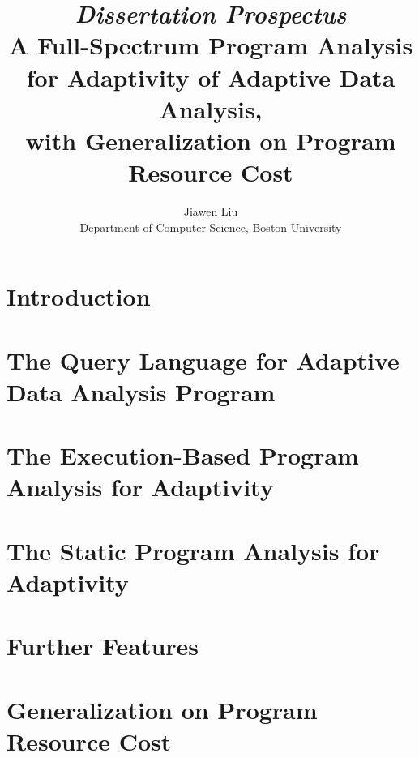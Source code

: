\documentclass[a4paper,11pt]{article}
\begin{document}
\title{{\em Dissertation Prospectus}
\\  A Full-Spectrum Program Analysis for Adaptivity of Adaptive Data Analysis, 
\\ with Generalization on Program Resource Cost}

\author{Jiawen Liu\\ Department of Computer Science, Boston University}
\maketitle
\begin{abstract}

\end{abstract}
\tableofcontents{}

\section{Introduction}
\label{sec:introduction}


\section{The Query Language for Adaptive Data Analysis Program}
\label{sec:language}


\section{The Execution-Based Program Analysis for Adaptivity}
\label{sec:dynamic}


\section{The Static Program Analysis for Adaptivity}
\label{sec:static}



\section{Further Features}
\label{sec:furthers}


\section{Generalization on Program Resource Cost}
\label{sec:generalization}

\end{document}
